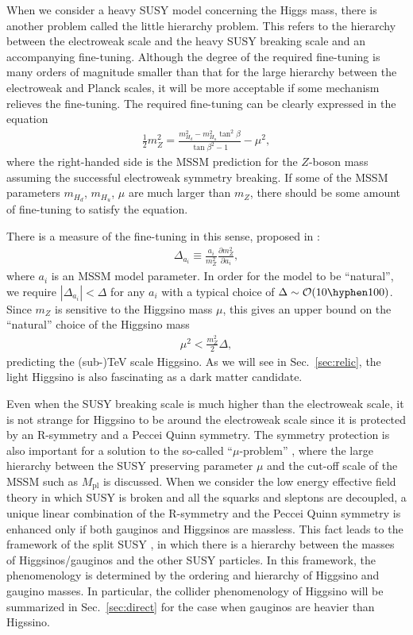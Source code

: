 \documentclass[12pt,twoside,book]{article}
\begin{document}
When we consider a heavy SUSY model concerning the Higgs mass, there is another problem called the little hierarchy problem.
This refers to the hierarchy between the electroweak scale and the heavy SUSY breaking scale and an accompanying fine-tuning.
Although the degree of the required fine-tuning is many orders of magnitude smaller than that for the large hierarchy between the electroweak and Planck scales, it will be more acceptable if some mechanism relieves the fine-tuning.
The required fine-tuning can be clearly expressed in the equation
\begin{align}
  \frac{1}{2} m_Z^2 = \frac{m_{H_d}^2 - m_{H_u}^2 \tan^2 \beta}{\tan \beta^2 - 1} - \mu^2,
\end{align}
where the right-handed side is the MSSM prediction for the $Z$-boson mass assuming the successful electroweak symmetry breaking.
If some of the MSSM parameters $m_{H_d}$, $m_{H_u}$, $\mu$ are much larger than $m_Z$, there should be some amount of fine-tuning to satisfy the equation.

There is a measure of the fine-tuning in this sense, proposed in \cite{Ellis:1986yg,Barbieri:1987fn}:
\begin{align}
  \Delta_{a_i} \equiv \frac{a_i}{m_Z^2} \frac{\partial m_Z^2}{\partial a_i},
\end{align}
where $a_i$ is an MSSM model parameter.
In order for the model to be ``natural'', we require $|\Delta_{a_i}| < \Delta$ for any $a_i$ with a typical choice of $\Delta \sim \mathcal{O}(10 \hyphen 100)$.
Since $m_Z$ is sensitive to the Higgsino mass $\mu$, this gives an upper bound on the ``natural'' choice of the Higgsino mass
\begin{align}
  \mu^2 < \frac{m_Z^2}{2} \Delta,
\end{align}
predicting the (sub-)TeV scale Higgsino.
As we will see in Sec.~\ref{sec:relic}, the light Higgsino is also fascinating as a dark matter candidate.

Even when the SUSY breaking scale is much higher than the electroweak scale, it is not strange for Higgsino to be around the electroweak scale since it is protected by an R-symmetry and a Peccei Quinn symmetry.
The symmetry protection is also important for a solution to the so-called ``$\mu$-problem'' \cite{Giudice:1988yz}, where the large hierarchy between the SUSY preserving parameter $\mu$ and the cut-off scale of the MSSM such as $M_{\mathrm{pl}}$ is discussed.
When we consider the low energy effective field theory in which SUSY is broken and all the squarks and sleptons are decoupled, a unique linear combination of the R-symmetry and the Peccei Quinn symmetry is enhanced only if both gauginos and Higgsinos are massless.
This fact leads to the framework of the split SUSY \cite{Giudice:2004tc}, in which there is a hierarchy between the masses of Higgsinos/gauginos and the other SUSY particles.
In this framework, the phenomenology is determined by the ordering and hierarchy of Higgsino and gaugino masses.
In particular, the collider phenomenology of Higgsino will be summarized in Sec.~\ref{sec:direct} for the case when gauginos are heavier than Higssino.
\end{document}
